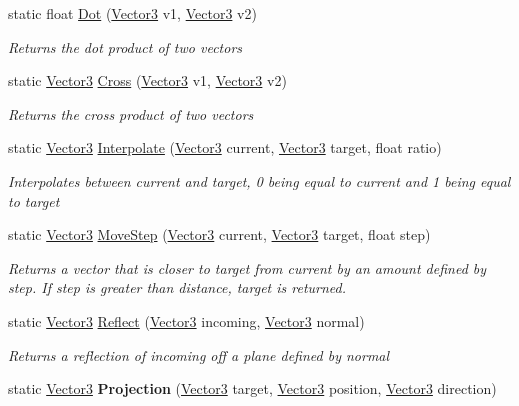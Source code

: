 \begin{DoxyCompactItemize}
\item 
static float \hyperlink{struct_engine_1_1_vector3_afb241ba10f85725de8e143a303ae4275}{Dot} (\hyperlink{struct_engine_1_1_vector3}{Vector3} v1, \hyperlink{struct_engine_1_1_vector3}{Vector3} v2)
\begin{DoxyCompactList}\small\item\em Returns the dot product of two vectors \end{DoxyCompactList}\item 
static \hyperlink{struct_engine_1_1_vector3}{Vector3} \hyperlink{struct_engine_1_1_vector3_a8c676da9b245b7a25fdd8e852966f7d3}{Cross} (\hyperlink{struct_engine_1_1_vector3}{Vector3} v1, \hyperlink{struct_engine_1_1_vector3}{Vector3} v2)
\begin{DoxyCompactList}\small\item\em Returns the cross product of two vectors \end{DoxyCompactList}\item 
static \hyperlink{struct_engine_1_1_vector3}{Vector3} \hyperlink{struct_engine_1_1_vector3_a9614026da99c203bc7ed04d503586f95}{Interpolate} (\hyperlink{struct_engine_1_1_vector3}{Vector3} current, \hyperlink{struct_engine_1_1_vector3}{Vector3} target, float ratio)
\begin{DoxyCompactList}\small\item\em Interpolates between current and target, 0 being equal to current and 1 being equal to target \end{DoxyCompactList}\item 
static \hyperlink{struct_engine_1_1_vector3}{Vector3} \hyperlink{struct_engine_1_1_vector3_a4eb7094ebb6f36cae7f4cdf68fbd2705}{Move\-Step} (\hyperlink{struct_engine_1_1_vector3}{Vector3} current, \hyperlink{struct_engine_1_1_vector3}{Vector3} target, float step)
\begin{DoxyCompactList}\small\item\em Returns a vector that is closer to target from current by an amount defined by step. If step is greater than distance, target is returned. \end{DoxyCompactList}\item 
static \hyperlink{struct_engine_1_1_vector3}{Vector3} \hyperlink{struct_engine_1_1_vector3_a0ff7c9fe315e9034b52bf7ef21b8a5e0}{Reflect} (\hyperlink{struct_engine_1_1_vector3}{Vector3} incoming, \hyperlink{struct_engine_1_1_vector3}{Vector3} normal)
\begin{DoxyCompactList}\small\item\em Returns a reflection of incoming off a plane defined by normal \end{DoxyCompactList}\item 
\hypertarget{struct_engine_1_1_vector3_ab3abf8e469c156be15bf30f99b94850b}{static \hyperlink{struct_engine_1_1_vector3}{Vector3} {\bfseries Projection} (\hyperlink{struct_engine_1_1_vector3}{Vector3} target, \hyperlink{struct_engine_1_1_vector3}{Vector3} position, \hyperlink{struct_engine_1_1_vector3}{Vector3} direction)}\label{struct_engine_1_1_vector3_ab3abf8e469c156be15bf30f99b94850b}


\end{DoxyCompactItemize}
